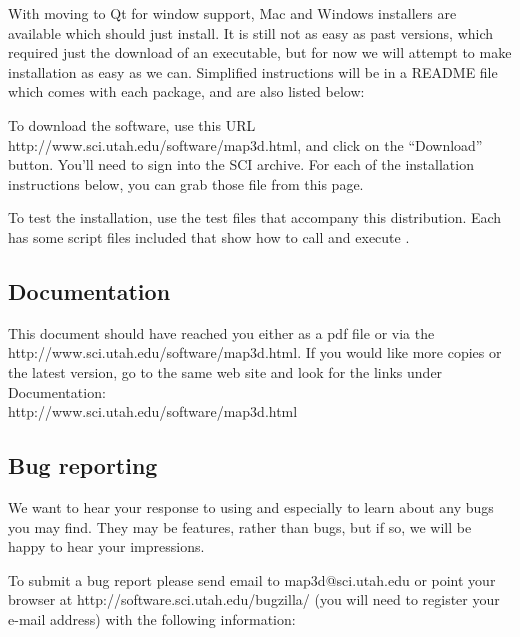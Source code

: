 With \map{} moving to Qt for window support, Mac and Windows installers
are available which should just install.  It is still not as easy
as past versions, which required just the download of an executable, but for
now we will attempt to make installation as easy as we can.  Simplified
instructions will be in a README file which comes with each package, and
are also listed below:

To download the software, use this URL
{http://www.sci.utah.edu/software/map3d.html}, and click on the
``Download'' button.  You'll need to sign into the SCI archive.  For
each of the installation instructions below, you can grab those file
from this page.


To test the installation, use the test files that accompany this
distribution.  Each has some script files included that show how to call
and execute \map{}.




%


\subsection{Documentation}

This document should have reached you either as a pdf file or via the
{http://www.sci.utah.edu/software/map3d.html}.  If you would like more
copies or the latest version, go to the
same web site and look for the links under Documentation:\\

{http://www.sci.utah.edu/software/map3d.html}

\subsection{Bug reporting}

We want to hear your response to using \map{} and especially to learn about
any bugs you may find.  They may be features, rather than bugs, but if so,
we will be happy to hear your impressions.

To submit a bug report please send email to map3d@sci.utah.edu or point your
browser at
{http://software.sci.utah.edu/bugzilla/} (you will need to register your e-mail
address) with the following information:

